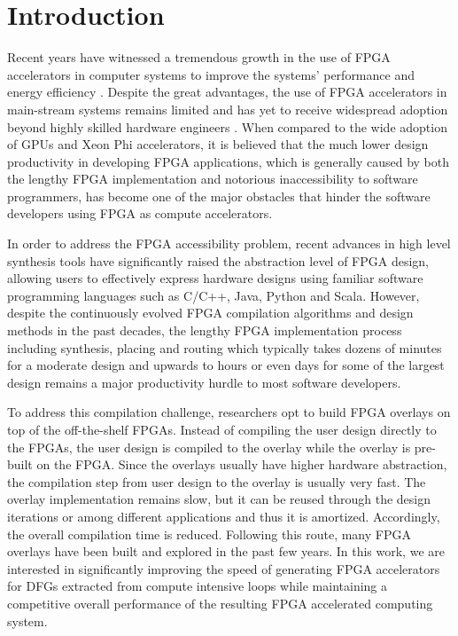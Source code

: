 \section{Introduction}\label{sec:introduction}
Recent years have witnessed a tremendous growth in the use of FPGA 
accelerators in computer systems to improve the systems' performance 
and energy efficiency \cite{kim2014compression, majumder2014hardware, 
iouliia2004reconfigurable, souradip2010hardware, putnam2014reconfigurable}. 
Despite the great advantages, the use of FPGA accelerators in main-stream 
systems remains limited and has yet to receive widespread adoption beyond 
highly skilled hardware engineers \cite{cong2011high}. When compared to the 
wide adoption of GPUs and Xeon Phi accelerators, it is believed that the much 
lower design productivity in developing FPGA applications, which is generally 
caused by both the lengthy FPGA implementation and notorious inaccessibility 
to software programmers, has become one of the major obstacles that hinder the 
software developers using FPGA as compute accelerators. 

In order to address the FPGA accessibility problem, recent advances 
in high level synthesis tools have significantly raised the abstraction level 
of FPGA design, allowing users to effectively express hardware designs using 
familiar software programming languages such as C/C++, Java, Python and Scala. 
However, despite the continuously evolved FPGA compilation algorithms and 
design methods in the past decades, the lengthy FPGA implementation process 
including synthesis, placing and routing which typically takes dozens of minutes 
for a moderate design and upwards to hours or even days for some of the 
largest design remains a major productivity hurdle to most software developers. 

To address this compilation challenge, researchers opt to build FPGA overlays on top of 
the off-the-shelf FPGAs. Instead of compiling the user design directly to the FPGAs, 
the user design is compiled to the overlay while the overlay is pre-built on the FPGA. 
Since the overlays usually have higher hardware abstraction, the compilation step 
from user design to the overlay is usually very fast. The overlay implementation 
remains slow, but it can be reused through the design iterations or among different 
applications and thus it is amortized. Accordingly, the overall compilation time is 
reduced. Following this route, many FPGA overlays 
have been built and explored in the past few years. In this work, 
we are interested in significantly improving the speed of generating 
FPGA accelerators for DFGs extracted from compute intensive loops   
while maintaining a competitive overall performance of the resulting 
FPGA accelerated computing system.


